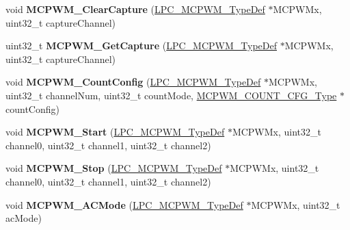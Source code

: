\begin{DoxyCompactItemize}
\item 
\hypertarget{group___m_c_p_w_m___public___functions_ga4ed3d8a6952db99f37fca604e45d5cae}{void {\bfseries \-M\-C\-P\-W\-M\-\_\-\-Clear\-Capture} (\hyperlink{struct_l_p_c___m_c_p_w_m___type_def}{\-L\-P\-C\-\_\-\-M\-C\-P\-W\-M\-\_\-\-Type\-Def} $\ast$\-M\-C\-P\-W\-Mx, uint32\-\_\-t capture\-Channel)}\label{group___m_c_p_w_m___public___functions_ga4ed3d8a6952db99f37fca604e45d5cae}

\item 
\hypertarget{group___m_c_p_w_m___public___functions_ga5f37fefd23719b3b323962a7a16837f4}{uint32\-\_\-t {\bfseries \-M\-C\-P\-W\-M\-\_\-\-Get\-Capture} (\hyperlink{struct_l_p_c___m_c_p_w_m___type_def}{\-L\-P\-C\-\_\-\-M\-C\-P\-W\-M\-\_\-\-Type\-Def} $\ast$\-M\-C\-P\-W\-Mx, uint32\-\_\-t capture\-Channel)}\label{group___m_c_p_w_m___public___functions_ga5f37fefd23719b3b323962a7a16837f4}

\item 
\hypertarget{group___m_c_p_w_m___public___functions_gae63d087dc23adc8bf28dce7a1a458b15}{void {\bfseries \-M\-C\-P\-W\-M\-\_\-\-Count\-Config} (\hyperlink{struct_l_p_c___m_c_p_w_m___type_def}{\-L\-P\-C\-\_\-\-M\-C\-P\-W\-M\-\_\-\-Type\-Def} $\ast$\-M\-C\-P\-W\-Mx, uint32\-\_\-t channel\-Num, uint32\-\_\-t count\-Mode, \hyperlink{struct_m_c_p_w_m___c_o_u_n_t___c_f_g___type}{\-M\-C\-P\-W\-M\-\_\-\-C\-O\-U\-N\-T\-\_\-\-C\-F\-G\-\_\-\-Type} $\ast$count\-Config)}\label{group___m_c_p_w_m___public___functions_gae63d087dc23adc8bf28dce7a1a458b15}

\item 
\hypertarget{group___m_c_p_w_m___public___functions_ga448a3c4be9f63c0a9acd46cdd5a1edaf}{void {\bfseries \-M\-C\-P\-W\-M\-\_\-\-Start} (\hyperlink{struct_l_p_c___m_c_p_w_m___type_def}{\-L\-P\-C\-\_\-\-M\-C\-P\-W\-M\-\_\-\-Type\-Def} $\ast$\-M\-C\-P\-W\-Mx, uint32\-\_\-t channel0, uint32\-\_\-t channel1, uint32\-\_\-t channel2)}\label{group___m_c_p_w_m___public___functions_ga448a3c4be9f63c0a9acd46cdd5a1edaf}

\item 
\hypertarget{group___m_c_p_w_m___public___functions_gac2376bba14abd68444dfc0bcf14b0ac1}{void {\bfseries \-M\-C\-P\-W\-M\-\_\-\-Stop} (\hyperlink{struct_l_p_c___m_c_p_w_m___type_def}{\-L\-P\-C\-\_\-\-M\-C\-P\-W\-M\-\_\-\-Type\-Def} $\ast$\-M\-C\-P\-W\-Mx, uint32\-\_\-t channel0, uint32\-\_\-t channel1, uint32\-\_\-t channel2)}\label{group___m_c_p_w_m___public___functions_gac2376bba14abd68444dfc0bcf14b0ac1}

\item 
\hypertarget{group___m_c_p_w_m___public___functions_gac95bf50eb70d6c425f690aa0df255e06}{void {\bfseries \-M\-C\-P\-W\-M\-\_\-\-A\-C\-Mode} (\hyperlink{struct_l_p_c___m_c_p_w_m___type_def}{\-L\-P\-C\-\_\-\-M\-C\-P\-W\-M\-\_\-\-Type\-Def} $\ast$\-M\-C\-P\-W\-Mx, uint32\-\_\-t ac\-Mode)}\label{group___m_c_p_w_m___public___functions_gac95bf50eb70d6c425f690aa0df255e06}


\end{DoxyCompactItemize}
